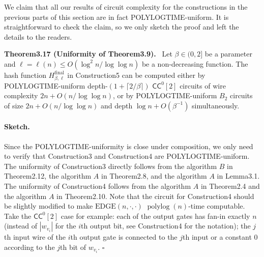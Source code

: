 \documentclass[10pt,a4paper]{article}
\newenvironment{authorclaim}[1]{\par\medskip\noindent\textbf{#1.}\ }{\par\medskip}
\begin{document}
We claim that all our results of circuit complexity for the constructions in the previous parts of this section are in fact POLYLOGTIME-uniform. It is straightforward to check the claim, so we only sketch the proof and left the details to the readers.
\begin{authorclaim}{Theorem3.17 (Uniformity of Theorem3.9)}
Let $\beta\in(0,2]$ be a parameter and $\ell=\ell(n)\le O(\log^2n/\log\log n)$ be a non-decreasing function. The hash function $H^{\mathrm{final}}_{\beta,\ell}$ in Construction5 can be computed either by POLYLOGTIME-uniform depth-$(1+\lceil2/\beta\rceil)$ $\mathsf{CC}^0[2]$ circuits of wire complexity $2n+O(n/\log\log n)$, or by POLYLOGTIME-uniform $B_2$ circuits of size $2n+O(n/\log\log n)$ and depth $\log n+O(\beta^{-1})$ simultaneously.
\end{authorclaim}
\paragraph{Sketch.}
Since the POLYLOGTIME-uniformity is close under composition, we only need to verify that Construction3 and Construction4 are POLYLOGTIME-uniform. The uniformity of Construction3 directly follows from the algorithm $B$ in Theorem2.12, the algorithm $A$ in Theorem2.8, and the algorithm $A$ in Lemma3.1. The uniformity of Construction4 follows from the algorithm $A$ in Theorem2.4 and the algorithm $A$ in Theorem2.10. Note that the circuit for Construction4 should be slightly modified to make $\mathrm{EDGE}(n,\cdot,\cdot)$ $\operatorname{polylog}(n)$-time computable. Take the $\mathsf{CC}^0[2]$ case for example: each of the output gates has fan-in exactly $n$ (instead of $|w_{v_i}|$ for the $i$th output bit, see Construction4 for the notation); the $j$th input wire of the $i$th output gate is connected to the $j$th input or a constant 0 according to the $j$th bit of $w_{v_i}$. \hfill$\square$

\end{document}
